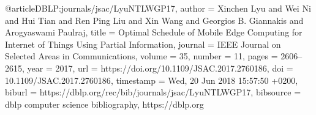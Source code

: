 @article{DBLP:journals/jsac/LyuNTLWGP17,
  author    = {Xinchen Lyu and
               Wei Ni and
               Hui Tian and
               Ren Ping Liu and
               Xin Wang and
               Georgios B. Giannakis and
               Arogyaswami Paulraj},
  title     = {Optimal Schedule of Mobile Edge Computing for Internet of Things Using
               Partial Information},
  journal   = {{IEEE} Journal on Selected Areas in Communications},
  volume    = {35},
  number    = {11},
  pages     = {2606--2615},
  year      = {2017},
  url       = {https://doi.org/10.1109/JSAC.2017.2760186},
  doi       = {10.1109/JSAC.2017.2760186},
  timestamp = {Wed, 20 Jun 2018 15:57:50 +0200},
  biburl    = {https://dblp.org/rec/bib/journals/jsac/LyuNTLWGP17},
  bibsource = {dblp computer science bibliography, https://dblp.org}
}